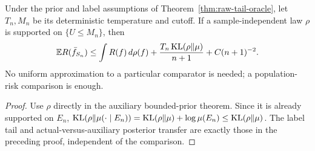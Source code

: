 \begin{corollary}
\label{cor:raw-supported-comparison}
Under the prior and label assumptions of
Theorem~\ref{thm:raw-tail-oracle}, let $T_n,M_n$ be its deterministic
temperature and cutoff. If a sample-independent law $\rho$ is supported
on $\{U\le M_n\}$, then
\[
 \mathbb E R(\bar f_{S_n})\le\int R(f)\,d\rho(f)
       +\frac{T_n\operatorname{KL}(\rho\Vert\mu)}{n+1}+C(n+1)^{-2}.
\]
No uniform approximation to a particular comparator is needed; a
population-risk comparison is enough.
\end{corollary}
\begin{proof}
Use $\rho$ directly in the auxiliary bounded-prior theorem. Since it
is already supported on $E_n$,
$\operatorname{KL}(\rho\Vert\mu(\cdot\mid E_n))=
 \operatorname{KL}(\rho\Vert\mu)+\log\mu(E_n)\le\operatorname{KL}(\rho\Vert\mu)$.
The label tail and actual-versus-auxiliary posterior transfer are
exactly those in the preceding proof, independent of the comparison.
\end{proof}

